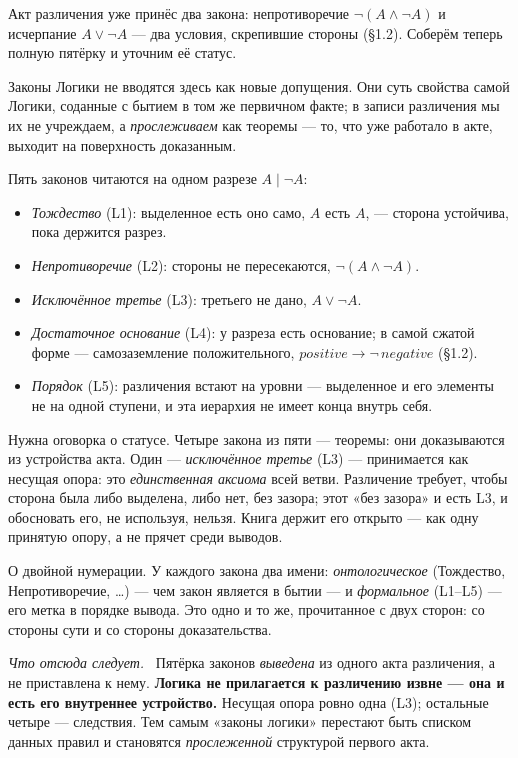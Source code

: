 \documentclass[12pt,a4paper]{article}
\newcommand{\rezultat}{\medskip\noindent\emph{Что отсюда следует.}\ }
\begin{document}
Акт различения уже принёс два закона: непротиворечие $\neg(A\wedge\neg A)$ и исчерпание
$A\vee\neg A$ --- два условия, скрепившие стороны (§1.2). Соберём теперь полную пятёрку и
уточним её статус.

Законы Логики не вводятся здесь как новые допущения. Они суть свойства самой Логики,
со\-данные с бытием в том же первичном факте; в записи различения мы их не учреждаем, а
\emph{прослеживаем} как теоремы --- то, что уже работало в акте, выходит на поверхность
доказанным.

Пять законов читаются на одном разрезе $A\mid\neg A$:
\begin{itemize}
\item \emph{Тождество} (L1): выделенное есть оно само, $A$ есть $A$, --- сторона устойчива,
пока держится разрез.
\item \emph{Непротиворечие} (L2): стороны не пересекаются, $\neg(A\wedge\neg A)$.
\item \emph{Исключённое третье} (L3): третьего не дано, $A\vee\neg A$.
\item \emph{Достаточное основание} (L4): у разреза есть основание; в самой сжатой форме ---
самозаземление положительного, $\mathit{positive}\to\neg\,\mathit{negative}$ (§1.2).
\item \emph{Порядок} (L5): различения встают на уровни --- выделенное и его элементы не на
одной ступени, и эта иерархия не имеет конца внутрь себя.
\end{itemize}

Нужна оговорка о статусе. Четыре закона из пяти --- теоремы: они доказываются из устройства
акта. Один --- \emph{исключённое третье} (L3) --- принимается как несущая опора: это
\emph{единственная аксиома} всей ветви. Различение требует, чтобы сторона была либо выделена,
либо нет, без зазора; этот «без зазора» и есть L3, и обосновать его, не используя, нельзя.
Книга держит его открыто --- как одну принятую опору, а не прячет среди выводов.

О двойной нумерации. У каждого закона два имени: \emph{онтологическое} (Тождество,
Непротиворечие, …) --- чем закон является в бытии --- и \emph{формальное} (L1–L5) --- его метка
в порядке вывода. Это одно и то же, прочитанное с двух сторон: со стороны сути и со стороны
доказательства.

\rezultat
Пятёрка законов \emph{выведена} из одного акта различения, а не приставлена к нему.
\textbf{Логика не прилагается к различению извне --- она и есть его внутреннее устройство.}
Несущая опора ровно одна (L3); остальные четыре --- следствия. Тем самым «законы логики»
перестают быть списком данных правил и становятся \emph{прослеженной} структурой первого акта.
\end{document}
